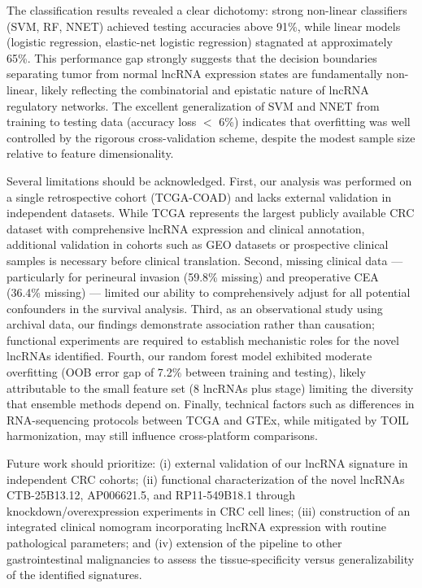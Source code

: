 \documentclass[fleqn,10pt]{wlscirep}
\begin{document}
The classification results revealed a clear dichotomy: strong non-linear classifiers (SVM, RF, NNET) achieved testing accuracies above 91\%, while linear models (logistic regression, elastic-net logistic regression) stagnated at approximately 65\%. This performance gap strongly suggests that the decision boundaries separating tumor from normal lncRNA expression states are fundamentally non-linear, likely reflecting the combinatorial and epistatic nature of lncRNA regulatory networks. The excellent generalization of SVM and NNET from training to testing data (accuracy loss $<$ 6\%) indicates that overfitting was well controlled by the rigorous cross-validation scheme, despite the modest sample size relative to feature dimensionality.

Several limitations should be acknowledged. First, our analysis was performed on a single retrospective cohort (TCGA-COAD) and lacks external validation in independent datasets. While TCGA represents the largest publicly available CRC dataset with comprehensive lncRNA expression and clinical annotation, additional validation in cohorts such as GEO datasets or prospective clinical samples is necessary before clinical translation. Second, missing clinical data --- particularly for perineural invasion (59.8\% missing) and preoperative CEA (36.4\% missing) --- limited our ability to comprehensively adjust for all potential confounders in the survival analysis. Third, as an observational study using archival data, our findings demonstrate association rather than causation; functional experiments are required to establish mechanistic roles for the novel lncRNAs identified. Fourth, our random forest model exhibited moderate overfitting (OOB error gap of 7.2\% between training and testing), likely attributable to the small feature set (8 lncRNAs plus stage) limiting the diversity that ensemble methods depend on. Finally, technical factors such as differences in RNA-sequencing protocols between TCGA and GTEx, while mitigated by TOIL harmonization, may still influence cross-platform comparisons.

Future work should prioritize: (i) external validation of our lncRNA signature in independent CRC cohorts; (ii) functional characterization of the novel lncRNAs CTB-25B13.12, AP006621.5, and RP11-549B18.1 through knockdown/overexpression experiments in CRC cell lines; (iii) construction of an integrated clinical nomogram incorporating lncRNA expression with routine pathological parameters; and (iv) extension of the pipeline to other gastrointestinal malignancies to assess the tissue-specificity versus generalizability of the identified signatures.
\end{document}
